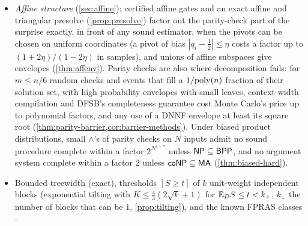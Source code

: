\begin{itemize}
with arbitrary sub-circuits $g_j$ of bounded arity and degree, whose scopes may
overlap like an expander, exponential tilting with a heat-bath sampler whose mixing is
certified by a locally checked Dobrushin condition, and a normaliser certified by
thermodynamic integration, is sound on every input (\cref{thm:local}); if the marginals
are bounded away from $0$ and $1$ and a constant fraction of the $g_j$ have private
pivotal inputs, it is complete for $m\ge m_0$ with $\poly(n)/\eps^2$ samples (constants
depending on the arity, the degree and these bounds) at every threshold up to the mean
under the crude certified tilt $\theta_0$, a range that contains thresholds with
$p=e^{-\Omega(m)}$. For supermodular statistics coupling from the past removes the
certificate (\cref{prop:local-cftp}).
\item \emph{Affine structure} (\cref{sec:affine}): certified affine gates and an exact
affine and triangular presolve (\cref{prop:presolve}) factor out the parity-check part
of the surprise exactly, in front of any sound estimator, when the pivots can be chosen
on uniform coordinates (a pivot of bias $|q_i-\frac12|\le\eta$ costs a factor up to
$(1+2\eta)/(1-2\eta)$ in samples), and unions of affine subspaces give envelopes
(\cref{thm:affenv}). Parity checks are also where
decomposition fails: for $m\le n/6$ random checks and events that fill a $1/\mathrm{poly}(n)$
fraction of their solution set, with high probability envelopes with small leaves,
context-width compilation and DFSB's completeness guarantee cost Monte Carlo's price up
to polynomial factors, and any use of a DNNF envelope at least its square root
(\cref{thm:parity-barrier,cor:barrier-methods}). Under biased product distributions,
small $\wedge$'s of parity checks on $N$ inputs admit no sound procedure complete within
a factor $2^{N^{1-\gamma}}$ unless $\mathsf{NP}\subseteq\mathsf{BPP}$, and no argument system complete
within a factor $2$ unless $\mathsf{coNP}\subseteq\mathsf{MA}$ (\cref{thm:biased-hard}).
\item Bounded treewidth (exact), thresholds $[S\ge t]$ of $k$ unit-weight independent
blocks (exponential tilting with $K\le\frac43(2\sqrt k+1)$ for $\mathbb{E}_DS\le t<k_+$, $k_+$
the number of blocks that can be $1$, \cref{prop:tilting}), and the known FPRAS classes
\cite{moitra2019,gkm2010}.
\end{itemize}

